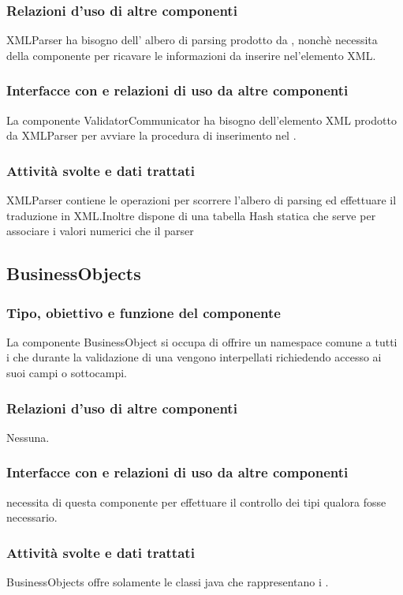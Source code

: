 \documentclass[11pt,titlepage,a4paper]{report}
\begin{document}
\subsubsection{Relazioni d'uso di altre componenti}
XMLParser ha bisogno dell' albero di parsing prodotto da \brp, nonch\`e necessita della componente \br per ricavare le informazioni da inserire nel'elemento XML.
\subsubsection{Interfacce con e relazioni di uso da altre componenti}
La componente ValidatorCommunicator ha bisogno dell'elemento XML prodotto da XMLParser per avviare la procedura di inserimento nel \re.
\subsubsection{Attivit\`a svolte e dati trattati}
XMLParser contiene le operazioni per scorrere l'albero di parsing ed effettuare il traduzione in XML.Inoltre dispone di una tabella Hash statica che serve per associare i valori numerici che il parser 

\subsection{BusinessObjects}%
\subsubsection{Tipo, obiettivo e funzione del componente}
La componente BusinessObject si occupa di offrire un namespace comune a tutti i \bos che durante la validazione di una \br vengono interpellati richiedendo accesso ai suoi campi o sottocampi.
\subsubsection{Relazioni d'uso di altre componenti}
Nessuna.
\subsubsection{Interfacce con e relazioni di uso da altre componenti}
\brp necessita di questa componente per effettuare il controllo dei tipi qualora fosse necessario.
\subsubsection{Attivit\`a svolte e dati trattati}
BusinessObjects offre solamente le classi java che rappresentano i \bos.
\end{document}

